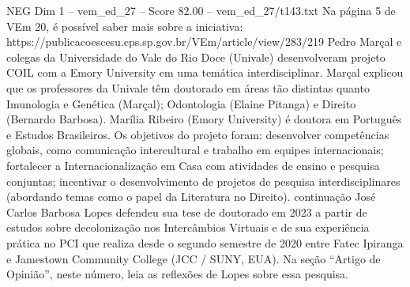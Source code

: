 \begin{textsample}{NEG Dim 1 – vem\_ed\_27 – Score 82.00 – vem\_ed\_27/t143.txt}
Na página 5 de VEm 20, é possível saber mais sobre a iniciativa: https://publicacoescesu.cps.sp.gov.br/VEm/article/view/283/219 Pedro Marçal e colegas da Universidade do Vale do Rio Doce (Univale) desenvolveram projeto COIL com a Emory University em uma temática interdisciplinar.
Marçal explicou que os professores da Univale têm doutorado em áreas tão distintas quanto Imunologia e Genética (Marçal); Odontologia (Elaine Pitanga) e Direito (Bernardo Barbosa).
Marília Ribeiro (Emory University) é doutora em Português e Estudos Brasileiros.
Os objetivos do projeto foram: desenvolver competências globais, como comunicação intercultural e trabalho em equipes internacionais; fortalecer a Internacionalização em Casa com atividades de ensino e pesquisa conjuntas; incentivar o desenvolvimento de projetos de pesquisa interdisciplinares (abordando temas como o papel da Literatura no Direito). continuação José Carlos Barbosa Lopes defendeu sua tese de doutorado em 2023 a partir de estudos sobre decolonização nos Intercâmbios Virtuais e de sua experiência prática no PCI que realiza desde o segundo semestre de 2020 entre Fatec Ipiranga e Jamestown Community College (JCC / SUNY, EUA).
Na seção “Artigo de Opinião”, neste número, leia as reflexões de Lopes sobre essa pesquisa.

\end{textsample}
